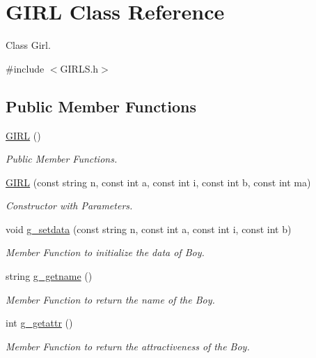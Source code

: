 \hypertarget{class_g_i_r_l}{}\section{G\+I\+RL Class Reference}
\label{class_g_i_r_l}


Class Girl.  




{\ttfamily \#include $<$G\+I\+R\+L\+S.\+h$>$}

\subsection*{Public Member Functions}
\begin{DoxyCompactItemize}
\item 
\hyperlink{class_g_i_r_l_aa465848c85b774d18f587c83ea4c0c1f}{G\+I\+RL} ()
\begin{DoxyCompactList}\small\item\em Public Member Functions. \end{DoxyCompactList}\item 
\hyperlink{class_g_i_r_l_a9389bd302224c1493537238b1c7af22e}{G\+I\+RL} (const string n, const int a, const int i, const int b, const int ma)
\begin{DoxyCompactList}\small\item\em Constructor with Parameters. \end{DoxyCompactList}\item 
void \hyperlink{class_g_i_r_l_a3a97308b7bb19f0e48e238779f80d261}{g\+\_\+setdata} (const string n, const int a, const int i, const int b)
\begin{DoxyCompactList}\small\item\em Member Function to initialize the data of Boy. \end{DoxyCompactList}\item 
string \hyperlink{class_g_i_r_l_a4e6773d24fa02ae3cbb32c6a0c7c2f40}{g\+\_\+getname} ()
\begin{DoxyCompactList}\small\item\em Member Function to return the name of the Boy. \end{DoxyCompactList}\item 
int \hyperlink{class_g_i_r_l_a570d488790b429cc907f80a27bb219c2}{g\+\_\+getattr} ()
\begin{DoxyCompactList}\small\item\em Member Function to return the attractiveness of the Boy. \end{DoxyCompactList}\item 

\end{DoxyCompactItemize}

